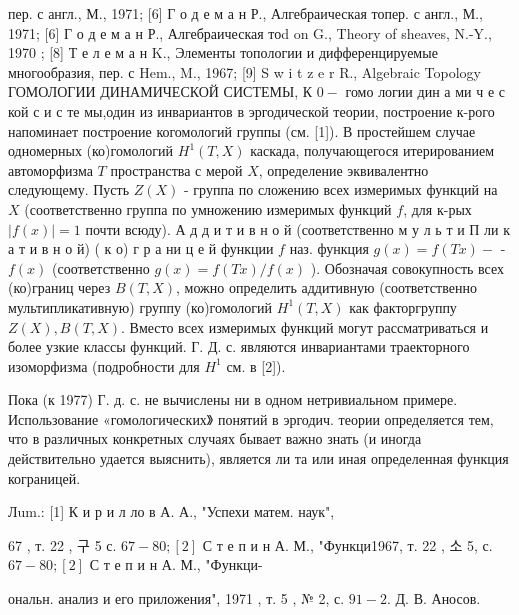 \documentclass[10pt]{article}
\begin{document}
пер. с англ., М., 1971; [6] Г о д е м а н Р., Алгебраическая топер. с англ., М., 1971; [6] Г о д е м а н Р., Алгебраическая тоd on G., Theory of sheaves, N.-Y., 1970 ; [8] Т е л е м а н K., Элементы топологии и дифференцируемые многообразия, пер. с Hem., M., 1967; [9] S w i t z e r R., Algebraic Topology ГОМОЛОГИИ ДИНАМИЧЕСКОЙ СИСТЕМЫ, К $0-$ гомо логии дин а ми ч е с кой с и с те мы,один из инвариантов в эргодической теории, построение к-рого напоминает построение когомологий группы (см. [1]). В простейшем случае одномерных (ко)гомологий $H^{1}(T, X)$ каскада, получающегося итерированием автоморфизма $T$ пространства с мерой $X$, определение эквивалентно следующему. Пусть $Z(X)$ - группа по сложению всех измеримых функций на $X$ (соответственно группа по умножению измеримых функций $f$, для к-рых $|f(x)|=1$ почти всюду). А д д и т и в н о й (соответственно м у л ь т и П ли к а т и в н о й) ( к о) г р а ни ц е й функции $f$ наз. функция $g(x)=f(T x)-$ - $f(x)$ (соответственно $g(x)=f(T x) / f(x)$ ). Обозначая совокупность всех (ко)границ через $B(T, X)$, можно определить аддитивную (соответственно мультипликативную) группу (ко)гомологий $H^{1}(T, X)$ как факторгруппу $Z(X), B(T, X)$. Вместо всех измеримых функций могут рассматриваться и более узкие классы функций. Г. Д. с. являются инвариантами траекторного изоморфизма (подробности для $H^{1}$ см. в [2]).



Пока (к 1977) Г. д. с. не вычислены ни в одном нетривиальном примере. Использование «гомологических》 понятий в эргодич. теории определяется тем, что в различных конкретных случаях бывает важно знать (и иногда действительно удается выяснить), является ли та или иная определенная функция кограницей.



Лum.: [1] К и р и л ло в А. А., "Успехи матем. наук",

67 , т. 22 , 구 5 с. $67-80 ;[2]$ С т е п и н А. М., "Функци1967, т. 22 , 소 5, с. $67-80 ;[2]$ С т е п и н А. М., "Функци-

ональн. анализ и его приложения", 1971 , т. 5 , № 2, с. $91-2$. Д. В. Аносов.
\end{document}
